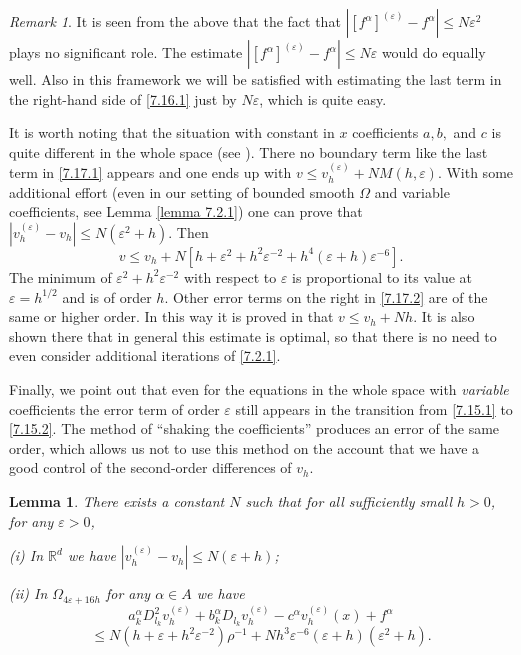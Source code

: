 \documentclass[11pt, reqno]{amsart}
\newtheorem{lemma}[theorem]{Lemma}
\theoremstyle{definition}
\theoremstyle{remark}
\newtheorem{remark}{Remark}[section]
\begin{document}
\begin{remark}
It is seen from the above that the fact that 
$|[f^{\alpha} ]
^{ (\varepsilon)}-f^{\alpha}|\leq N\varepsilon^{2}$ plays no significant role.
The estimate $|[f^{\alpha} ]
^{ (\varepsilon)}-f^{\alpha}|\leq N\varepsilon $ would do equally well.
Also in this framework we will be satisfied with
estimating the last term in the right-hand side of \eqref{7.16.1} just
by $N\varepsilon$, which is quite easy.

It is worth noting that the situation with constant in $x$
coefficients $a,b,$ and $c$ is quite different in the whole
space (see \cite{DK05}).
 There no boundary term like the last term in \eqref{7.17.1}
appears and one ends up with $v\leq v_{h}^{(\varepsilon)}+NM(h,\varepsilon)$.
With some additional effort (even in our setting of bounded smooth
$\Omega$ and variable coefficients, see
Lemma \ref{lemma 7.2.1}) one can prove that 
$|v_{h}^{(\varepsilon)}-v_{h}|\leq N(\varepsilon^{2}+h)$.
Then
\begin{equation}
                                                       \label{7.17.2}
v\leq v_{h} +N
[h+\varepsilon^{2}+ h^{2}\varepsilon^{-2}+h^{4}(\varepsilon+h)
\varepsilon^{-6}].
\end{equation}
The minimum of $\varepsilon^{2}+ h^{2}\varepsilon^{-2}$ with respect
to $\varepsilon$ is proportional to its value at $\varepsilon=h^{1/2}$
and is of order $h$. Other error terms on the right in \eqref{7.17.2}
are of the same or higher order. In this way it is proved in 
\cite{DK05} that $v\leq v_{h} +Nh$. It is also shown there that
in general this estimate is optimal, so that there is no need
to even consider additional iterations of \eqref{7.2.1}.

Finally, we point out that even for the equations in the whole
space with {\em variable\/} coefficients the error term
of order $\varepsilon$ still appears in the transition from
\eqref{7.15.1} to \eqref{7.15.2}. The method of
``shaking the coefficients'' produces an error of the same
order, which allows us not to use this method on the
account that we have a good control of the second-order differences 
of $v_{h}$.

 \end{remark}

\begin{lemma}
                                           \label{lemma 6.29.1}
There exists a constant $N$ such that for all sufficiently
small $h>0$, for any $\varepsilon>0$,

(i) In ${\mathbb{R}}^{d}$ we have $|v^{(\varepsilon)}_{h}-v_{h}|
\leq N( \varepsilon +h)$;

(ii) In $\Omega_{4\varepsilon+16h}$ for any $\alpha\in A$ we have
$$
  a_{k}^{\alpha} D^{2}_{l_{k}}v^{ (\varepsilon)}_{h} 
+b_{k}^{\alpha}  D _{l_{k}}v^{ (\varepsilon)}_{h} 
-c^{\alpha} v^{ (\varepsilon)}_{h}(x)+f^{\alpha}   
$$
\begin{equation}
                                                    \label{6.29.2}
\leq
N(h+\varepsilon+h^{2}\varepsilon^{-2})\rho^{-1}+N
h^{3}\varepsilon^{-6}(\varepsilon+h)(\varepsilon^{2}+h).
\end{equation}

\end{lemma} 
\end{document}
